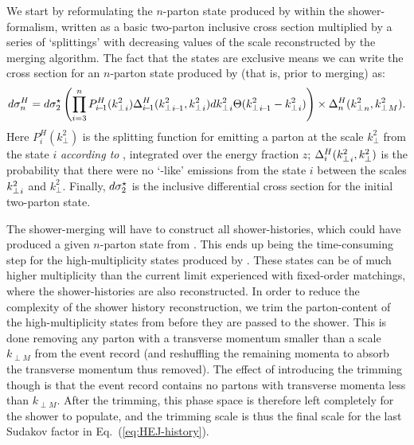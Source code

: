 We start by reformulating the $n$-parton state produced by \HEJ within the
shower-formalism, written as a basic two-parton inclusive cross section
multiplied by a series of `\HEJ splittings' with decreasing values of
the scale reconstructed by the merging algorithm.
%
%
The fact that
the \HEJ states are exclusive means we can write the cross section for an
$n$-parton state produced by \HEJ (that is, prior to merging) as:
\begin{equation}
  \label{eq:HEJ-history}
  d\sigma_n^H=
  d\sigmab \left(\prod_{i=3}^nP_{i\!-\!1}^H(\kti{i})\Delta_{i\!-\!1}^H(\kti{i\!-\!1},\kti{i})
    d\kti{i}\Theta(\kti{i\!-\!1}-\kti{i})\right)\times\Delta_{n}^H(\kti{n},\kti{M}).
\end{equation}
Here $P^H_i(k_\perp^2)$ is the splitting function for
emitting a parton at the scale $k_\perp^2$ from the state $i$
\textit{according to \HEJ}, integrated over the energy fraction $z$;
$\Delta_i^H({k^2_\perp}_{i},k_\perp^2)$ is the probability that there were no
`\HEJ-like' emissions from the state $i$ between the scales ${k^2_\perp}_{i}$
and $k_\perp^2$.  Finally, $d\sigma_2^{\star}$ is the inclusive differential
cross section for the initial two-parton state. 

The shower-merging will have to construct all shower-histories, which could
have produced a given $n$-parton state from \HEJ. This ends up being the
time-consuming step for the high-multiplicity states produced by \HEJ. These
states can be of much higher multiplicity than the current limit experienced
with fixed-order matchings, where the shower-histories are also
reconstructed. In order to reduce the complexity of the shower history
reconstruction, we trim the parton-content of the high-multiplicity
states from \HEJ before they are passed to the shower. This is done removing any parton with a
transverse momentum smaller than a scale $k_{\perp M}$ from the event record
(and reshuffling the remaining momenta to absorb the transverse momentum thus
removed).  The effect of
introducing the trimming though is that the event record contains no partons
with transverse momenta less than $k_{\perp M}$. After the trimming, this
phase space is therefore left completely for the shower to populate, and the
trimming scale is thus the final scale for the last Sudakov factor in
Eq.~(\ref{eq:HEJ-history}).

